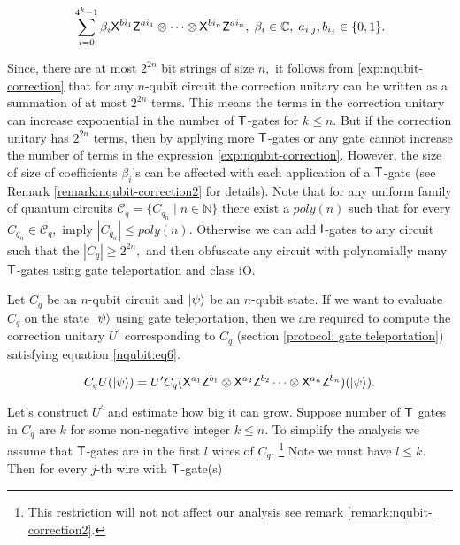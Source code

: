 \begin{equation}
\label{exp:nqubit-correction}
\sum_{i=0}^{4^k-1} \beta_i {\sf X}^{b{i_1}} {\sf Z}^{a{i_1}}\otimes \cdots \otimes {\sf X}^{b{i_n}} {\sf Z}^{a{i_n}},\; \beta_i\in\mathbb{C},\; a_{i,j},b_{i_j}\in\{0,1\}.
\end{equation}

Since, there are at most $2^{2n}$ bit strings of size $n,$ it follows from  \ref{exp:nqubit-correction} that for any $n$-qubit circuit the correction unitary can be written as a summation of at most $2^{2n}$ terms. This means the terms in the correction unitary can increase exponential in the number of ${\sf T}$-gates for $k\leq n.$ But if the correction unitary has $2^{2n}$ terms, then by applying more ${\sf T}$-gates or any gate cannot increase the number of terms in the expression \ref{exp:nqubit-correction}. However,  the size of size of coefficients $\beta_i$'s can be affected with each application of a ${\sf T}$-gate (see Remark \ref{remark:nqubit-correction2} for details). Note that for any uniform family of quantum circuits 
$\mathcal{C}_q=\{C_{q_n}\mid n\in \mathbb{N}\}$ there exist a $poly(n)$ such that for every $C_{q_n}\in \mathcal{C}_q,$ imply $|C_{q_n}|\leq poly(n).$ Otherwise we can add ${\sf I}$-gates to any circuit such that the $|C_q|\geq 2^{2n},$ and then obfuscate any circuit with polynomially many ${\sf T}$-gates using gate teleportation and class iO.


Let $C_q$ be an $n$-qubit circuit and ${\lvert}\psi\rangle$ be an $n$-qubit state. If we want to evaluate $C_q$ on the state ${\lvert}\psi\rangle$ using gate teleportation, then we are required to compute the correction unitary $U^\prime$ corresponding to $C_q$ (section \ref{protocol: gate  teleportation}) satisfying equation \ref{nqubit:eq6}.

\begin{equation}
\label{nqubit:eq6}
C_qU({\lvert}\psi\rangle)= U^\prime C_q ({\sf X}^{a_{1}}{\sf Z}^{b_{1}}\otimes {\sf X}^{a_{2}}{\sf Z}^{b_{2}}\cdots \otimes {\sf X}^{a_{n}}{\sf Z}^{b_{n}})({\lvert}\psi\rangle).
\end{equation}


Let's construct $U^\prime$ and estimate how big it can grow. Suppose number of ${\sf T}$ gates in $C_q$ are $k$ for some non-negative integer $k\leq n.$ To simplify the analysis we assume that ${\sf T}$-gates are in the first $l$ wires of $C_q.$ \footnote{This restriction will not not affect our analysis see  remark \ref{remark:nqubit-correction2}.} Note we must have $l\leq k.$ Then for every $j$-th wire with ${\sf T}$-gate(s)


